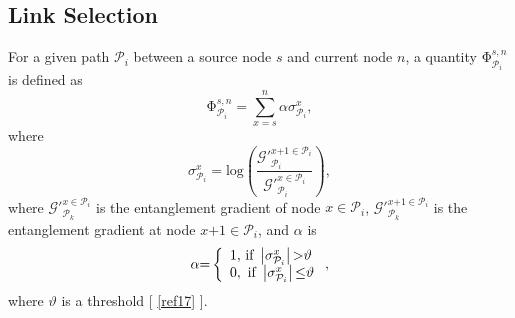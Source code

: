 \documentclass[11pt]{article}%
\newcommand*{\cref}[1]{%
  \begingroup
    \hypersetup{
      linkcolor=linkequation,
      linkbordercolor=linkequation,
    }%
    \ref{#1}%
  \endgroup
}
\begin{document}
\subsection{Link Selection}

 For a given path ${\mathcal{P}}_i$ between a source node $s$ and current node $n$, a quantity ${\mathrm{\Phi }}^{s,n}_{{\mathcal{P}}_i}$ is defined as 
\begin{equation} \label{ZEqnNum650027} 
{\mathrm{\Phi }}^{s,n}_{{\mathcal{P}}_i}\mathrm{=}\sum^n_{x\mathrm{=}s}{\alpha {\sigma }^x_{{\mathcal{P}}_i}},                                                                                
\end{equation} 
where
\begin{equation} \label{ZEqnNum212998} 
{\sigma }^x_{{\mathcal{P}}_i}\mathrm{=log}\left(\frac{{\mathcal{G}}'^{x\mathrm{+1}\mathrm{\in }{\mathcal{P}}_i}_{{\mathcal{P}}_i}}{{\mathcal{G}}'^{x\mathrm{\in }{\mathcal{P}}_i}_{{\mathcal{P}}_i}}\right),                                                                             
\end{equation} 
where ${\mathcal{G}}'^{x\mathrm{\in }{\mathcal{P}}_i}_{{\mathcal{P}}_k}$ is the entanglement gradient of node $x\mathrm{\in }{\mathcal{P}}_i$, ${\mathcal{G}}'^{x\mathrm{+1}\mathrm{\in }{\mathcal{P}}_i}_{{\mathcal{P}}_k}$ is the entanglement gradient at node $x\mathrm{+1}\mathrm{\in }{\mathcal{P}}_i$, and $\alpha $ is
\begin{equation} \label{ZEqnNum549282} 
\alpha \mathrm{=}\left\{ \begin{array}{l}
\mathrm{1,}\textnormal{ if }\left|{\sigma }^x_{{\mathcal{P}}_i}\right|\mathrm{>}\vartheta  \\ 
0,\textnormal{ if }\left|{\sigma }^x_{{\mathcal{P}}_i}\right|\mathrm{\le }\vartheta  \end{array}
\right.,                                                                         
\end{equation} 
where $\vartheta $ is a threshold [\cref{ref17}]. 
\end{document}
